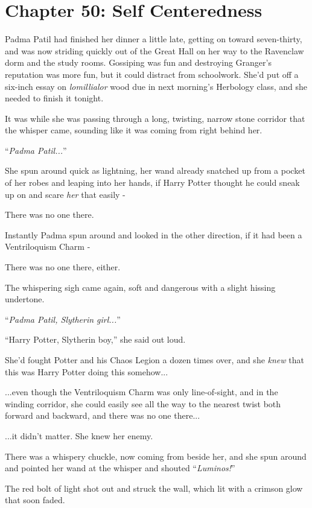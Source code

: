 \chapter{Chapter 50: Self Centeredness}
Padma Patil had finished her dinner a little late, getting on toward seven-thirty, and was now striding quickly out of the Great Hall on her way to the Ravenclaw dorm and the study rooms. Gossiping was fun and destroying Granger's reputation was more fun, but it could distract from schoolwork. She'd put off a six-inch essay on \emph{lomillialor} wood due in next morning's Herbology class, and she needed to finish it tonight.

It was while she was passing through a long, twisting, narrow stone corridor that the whisper came, sounding like it was coming from right behind her.

``\emph{Padma Patil...}''

She spun around quick as lightning, her wand already snatched up from a pocket of her robes and leaping into her hands, if Harry Potter thought he could sneak up on and scare \emph{her} that easily -

There was no one there.

Instantly Padma spun around and looked in the other direction, if it had been a Ventriloquism Charm -

There was no one there, either.

The whispering sigh came again, soft and dangerous with a slight hissing undertone.

``\emph{Padma Patil, Slytherin girl...}''

``Harry Potter, Slytherin boy,'' she said out loud.

She'd fought Potter and his Chaos Legion a dozen times over, and she \emph{knew} that this was Harry Potter doing this somehow...

...even though the Ventriloquism Charm was only line-of-sight, and in the winding corridor, she could easily see all the way to the nearest twist both forward and backward, and there was no one there...

...it didn't matter. She knew her enemy.

There was a whispery chuckle, now coming from beside her, and she spun around and pointed her wand at the whisper and shouted ``\emph{Luminos!}''

The red bolt of light shot out and struck the wall, which lit with a crimson glow that soon faded.

